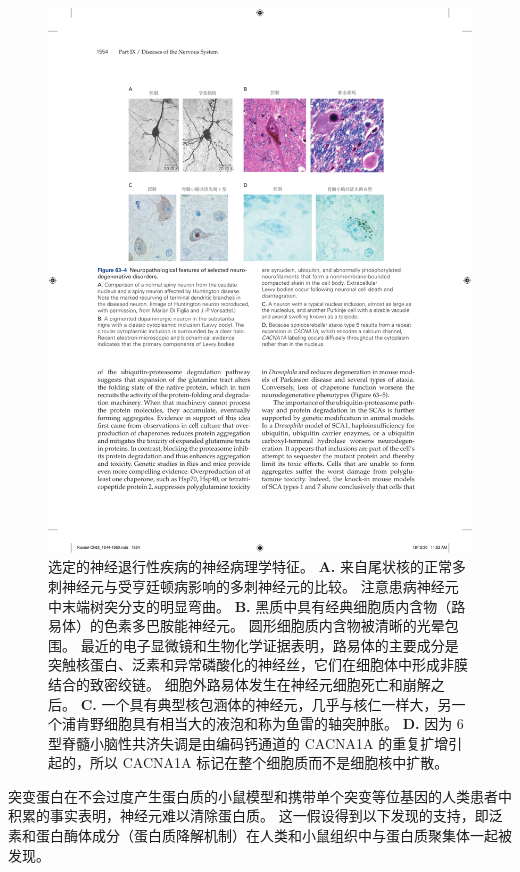 \begin{figure}[htbp]
	\centering
	\includegraphics[width=1.0\linewidth]{chap63/fig_63_4}
	\caption{选定的神经退行性疾病的神经病理学特征。
		\textbf{A.} 来自尾状核的正常多刺神经元与受亨廷顿病影响的多刺神经元的比较。
		注意患病神经元中末端树突分支的明显弯曲。
		\textbf{B.} 黑质中具有经典细胞质内含物（路易体）的色素多巴胺能神经元。
		圆形细胞质内含物被清晰的光晕包围。
		最近的电子显微镜和生物化学证据表明，路易体的主要成分是突触核蛋白、泛素和异常磷酸化的神经丝，它们在细胞体中形成非膜结合的致密绞链。
		细胞外路易体发生在神经元细胞死亡和崩解之后。
		\textbf{C.} 一个具有典型核包涵体的神经元，几乎与核仁一样大，另一个浦肯野细胞具有相当大的液泡和称为鱼雷的轴突肿胀。
		\textbf{D.} 因为 6 型脊髓小脑性共济失调是由编码钙通道的 CACNA1A 的重复扩增引起的，所以 CACNA1A 标记在整个细胞质而不是细胞核中扩散。}
	\label{fig:63_4}
\end{figure}


突变蛋白在不会过度产生蛋白质的小鼠模型和携带单个突变等位基因的人类患者中积累的事实表明，神经元难以清除蛋白质。
这一假设得到以下发现的支持，即泛素和蛋白酶体成分（蛋白质降解机制）在人类和小鼠组织中与蛋白质聚集体一起被发现。



